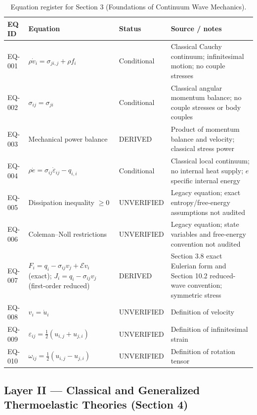 \begin{table}[htbp]
\centering
\small
\setlength{\tabcolsep}{3pt}
\caption{Equation register for Section 3 (Foundations of Continuum Wave Mechanics).}
\label{tab:appA-sec3}
\begin{tabularx}{\textwidth}{@{}p{1.6cm}Y p{2.8cm}Y@{}}
\toprule
\textbf{EQ ID} & \textbf{Equation} & \textbf{Status} & \textbf{Source / notes} \\
\midrule
EQ-001 & $\rho \dot{v}_i = \sigma_{ji,j} + \rho f_i$ & Conditional & Classical Cauchy continuum; infinitesimal motion; no couple stresses \\
EQ-002 & $\sigma_{ij} = \sigma_{ji}$ & Conditional & Classical angular momentum balance; no couple stresses or body couples \\
EQ-003 & Mechanical power balance & DERIVED & Product of momentum balance and velocity; classical stress power \\
EQ-004 & $\rho \dot{e} = \sigma_{ij}\dot{\varepsilon}_{ij} - q_{i,i}$ & Conditional & Classical local continuum; no internal heat supply; $e$ specific internal energy \\
EQ-005 & Dissipation inequality $\geq 0$ & UNVERIFIED & Legacy equation; exact entropy/free-energy assumptions not audited \\
EQ-006 & Coleman--Noll restrictions & UNVERIFIED & Legacy equation; state variables and free-energy convention not audited \\
EQ-007 & $F_i=q_i-\sigma_{ij}v_j+\mathcal{E}v_i$ (exact); $J_i=q_i-\sigma_{ij}v_j$ (first-order reduced) & DERIVED & Section 3.8 exact Eulerian form and Section 10.2 reduced-wave convention; symmetric stress \\
EQ-008 & $v_i = \dot{u}_i$ & UNVERIFIED & Definition of velocity \\
EQ-009 & $\varepsilon_{ij} = \tfrac{1}{2}(u_{i,j} + u_{j,i})$ & UNVERIFIED & Definition of infinitesimal strain \\
EQ-010 & $\omega_{ij} = \tfrac{1}{2}(u_{i,j} - u_{j,i})$ & UNVERIFIED & Definition of rotation tensor \\
\bottomrule
\end{tabularx}
\end{table}

\subsection{Layer II — Classical and Generalized Thermoelastic Theories (Section 4)}


